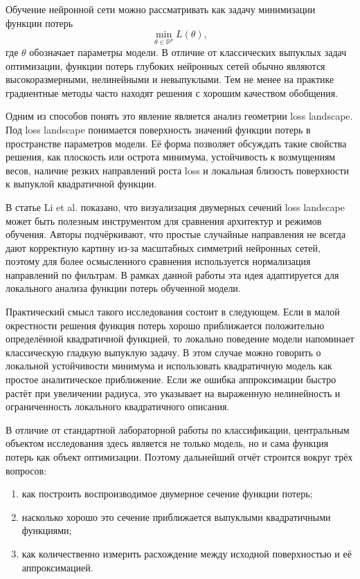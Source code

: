 \documentclass[12pt,a4paper]{article}
\begin{document}
Обучение нейронной сети можно рассматривать как задачу минимизации функции потерь
\[
    \min_{\theta \in \mathbb{R}^{p}} L(\theta),
\]
где $\theta$ обозначает параметры модели. В отличие от классических выпуклых задач оптимизации, функции потерь глубоких нейронных сетей обычно являются высокоразмерными, нелинейными и невыпуклыми. Тем не менее на практике градиентные методы часто находят решения с хорошим качеством обобщения.

Одним из способов понять это явление является анализ геометрии loss landscape. Под loss landscape понимается поверхность значений функции потерь в пространстве параметров модели. Её форма позволяет обсуждать такие свойства решения, как плоскость или острота минимума, устойчивость к возмущениям весов, наличие резких направлений роста loss и локальная близость поверхности к выпуклой квадратичной функции.

В статье Li et al. \cite{li2018visualizing} показано, что визуализация двумерных сечений loss landscape может быть полезным инструментом для сравнения архитектур и режимов обучения. Авторы подчёркивают, что простые случайные направления не всегда дают корректную картину из-за масштабных симметрий нейронных сетей, поэтому для более осмысленного сравнения используется нормализация направлений по фильтрам. В рамках данной работы эта идея адаптируется для локального анализа функции потерь обученной модели.

Практический смысл такого исследования состоит в следующем. Если в малой окрестности решения функция потерь хорошо приближается положительно определённой квадратичной функцией, то локально поведение модели напоминает классическую гладкую выпуклую задачу. В этом случае можно говорить о локальной устойчивости минимума и использовать квадратичную модель как простое аналитическое приближение. Если же ошибка аппроксимации быстро растёт при увеличении радиуса, это указывает на выраженную нелинейность и ограниченность локального квадратичного описания.

В отличие от стандартной лабораторной работы по классификации, центральным объектом исследования здесь является не только модель, но и сама функция потерь как объект оптимизации. Поэтому дальнейший отчёт строится вокруг трёх вопросов:
\begin{enumerate}
    \item как построить воспроизводимое двумерное сечение функции потерь;
    \item насколько хорошо это сечение приближается выпуклыми квадратичными функциями;
    \item как количественно измерить расхождение между исходной поверхностью и её аппроксимацией.
\end{enumerate}
\end{document}
